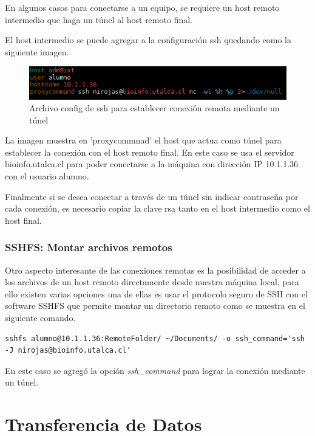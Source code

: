 \documentclass[12pt]{article}
\begin{document}
En algunos casos para conectarse a un equipo, se requiere un host remoto intermedio que haga un túnel al host remoto final.

El host intermedio se puede agregar a la configuración ssh quedando como la siguiente imagen. 

\begin{figure}[!h]
   \centering
   \includegraphics[scale=.82]{imgs/proxy_config.PNG}
   \caption{Archivo config de ssh para establecer conexión remota mediante un túnel}
   \label{fig6}
\end{figure}

La imagen muestra en 'proxycommnad' el host que actua como túnel para establecer la conexión con el host remoto final. En este caso se usa el servidor bioinfo.utalca.cl para poder conectarse a la máquina con dirección IP 10.1.1.36 con el usuario alumno.

Finalmente si se desea conectar a través de un túnel sin indicar contraseña por cada conexión, es necesario copiar la clave rsa tanto en el host intermedio como el host final.

\subsubsection{ SSHFS: Montar archivos remotos}

Otro aspecto interesante de las conexiones remotas es la posibilidad de acceder a los archivos de un host remoto directamente desde nuestra máquina local, para ello existen varias opciones una de ellas es usar el protocolo seguro de SSH con el software SSHFS que permite montar un directorio remoto como se muestra en el siguiente comando.

\begin{lstlisting}[frame=single]
sshfs alumno@10.1.1.36:RemoteFolder/ ~/Documents/ -o ssh_command='ssh -J nirojas@bioinfo.utalca.cl'
\end{lstlisting}

En este caso se agregó la opción \emph{ssh\_command} para lograr la conexión mediante un túnel.

\section{Transferencia de Datos}
\end{document}
